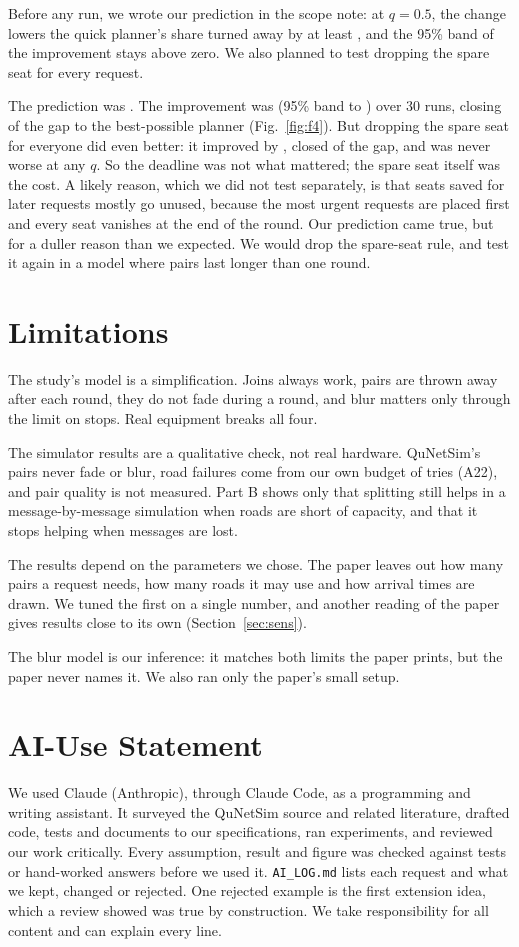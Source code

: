 \documentclass[conference]{IEEEtran}
\begin{document}
Before any run, we wrote our prediction in the scope note: at $q=0.5$, the change lowers the quick planner's share turned away by at least \extThreshold, and the 95\% band of the improvement stays above zero. We also planned to test dropping the spare seat for every request.

The prediction was \extVerdict. The improvement was \extDiffqFive{} (95\% band \extCIloqFive{} to \extCIhiqFive) over 30 runs, closing \extGapDeadqFive{} of the gap to the best-possible planner (Fig.~\ref{fig:f4}). But dropping the spare seat for everyone did even better: it improved by \extDoneDiffqFive, closed \extGapDoneqFive{} of the gap, and was never worse at any $q$. So the deadline was not what mattered; the spare seat itself was the cost. A likely reason, which we did not test separately, is that seats saved for later requests mostly go unused, because the most urgent requests are placed first and every seat vanishes at the end of the round. Our prediction came true, but for a duller reason than we expected. We would drop the spare-seat rule, and test it again in a model where pairs last longer than one round.

\section{Limitations}
The study's model is a simplification. Joins always work, pairs are thrown away after each round, they do not fade during a round, and blur matters only through the limit on stops. Real equipment breaks all four.

The simulator results are a qualitative check, not real hardware. QuNetSim's pairs never fade or blur, road failures come from our own budget of tries (A22), and pair quality is not measured. Part B shows only that splitting still helps in a message-by-message simulation when roads are short of capacity, and that it stops helping when messages are lost.

The results depend on the parameters we chose. The paper leaves out how many pairs a request needs, how many roads it may use and how arrival times are drawn. We tuned the first on a single number, and another reading of the paper gives results close to its own (Section~\ref{sec:sens}).

The blur model is our inference: it matches both limits the paper prints, but the paper never names it. We also ran only the paper's small setup.

\section*{AI-Use Statement}
We used Claude (Anthropic), through Claude Code, as a programming and writing assistant. It surveyed the QuNetSim source and related literature, drafted code, tests and documents to our specifications, ran experiments, and reviewed our work critically. Every assumption, result and figure was checked against tests or hand-worked answers before we used it. \texttt{AI\_LOG.md} lists each request and what we kept, changed or rejected. One rejected example is the first extension idea, which a review showed was true by construction. We take responsibility for all content and can explain every line.
\end{document}
